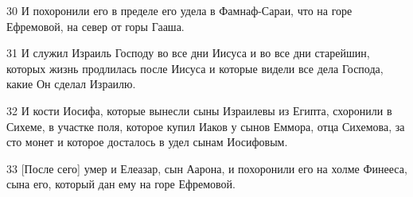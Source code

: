 \par 30 И похоронили его в пределе его удела в Фамнаф-Сараи, что на горе Ефремовой, на север от горы Гааша.
\par 31 И служил Израиль Господу во все дни Иисуса и во все дни старейшин, которых жизнь продлилась после Иисуса и которые видели все дела Господа, какие Он сделал Израилю.
\par 32 И кости Иосифа, которые вынесли сыны Израилевы из Египта, схоронили в Сихеме, в участке поля, которое купил Иаков у сынов Еммора, отца Сихемова, за сто монет и которое досталось в удел сынам Иосифовым.
\par 33 [После сего] умер и Елеазар, сын Аарона, и похоронили его на холме Финееса, сына его, который дан ему на горе Ефремовой.


